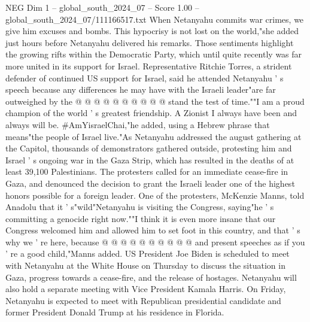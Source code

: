 \begin{textsample}{NEG Dim 1 – global\_south\_2024\_07 – Score 1.00 – global\_south\_2024\_07/111166517.txt}
When Netanyahu commits war crimes, we give him excuses and bombs.
This hypocrisy is not lost on the world,"she added just hours before Netanyahu delivered his remarks.
Those sentiments highlight the growing rifts within the Democratic Party, which until quite recently was far more united in its support for Israel.
Representative Ritchie Torres, a strident defender of continued US support for Israel, said he attended Netanyahu ' s speech because any differences he may have with the Israeli leader"are far outweighed by the @ @ @ @ @ @ @ @ @ @ stand the test of time.""I am a proud champion of the world ' s greatest friendship.
A Zionist I always have been and always will be. \#AmYisraelChai,"he added, using a Hebrew phrase that means"the people of Israel live."As Netanyahu addressed the august gathering at the Capitol, thousands of demonstrators gathered outside, protesting him and Israel ' s ongoing war in the Gaza Strip, which has resulted in the deaths of at least 39,100 Palestinians.
The protesters called for an immediate cease-fire in Gaza, and denounced the decision to grant the Israeli leader one of the highest honors possible for a foreign leader.
One of the protesters, McKenzie Manns, told Anadolu that it ' s"wild"Netanyahu is visiting the Congress, saying"he ' s committing a genocide right now.""I think it is even more insane that our Congress welcomed him and allowed him to set foot in this country, and that ' s why we ' re here, because @ @ @ @ @ @ @ @ @ @ and present speeches as if you ' re a good child,"Manns added.
US President Joe Biden is scheduled to meet with Netanyahu at the White House on Thursday to discuss the situation in Gaza, progress towards a cease-fire, and the release of hostages.
Netanyahu will also hold a separate meeting with Vice President Kamala Harris.
On Friday, Netanyahu is expected to meet with Republican presidential candidate and former President Donald Trump at his residence in Florida.

\end{textsample}
